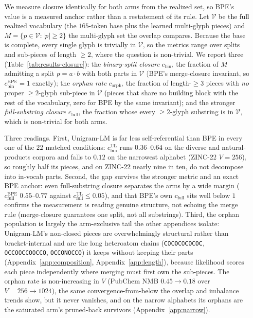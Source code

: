 \documentclass{article}
\begin{document}
We measure closure identically for both arms from the realized set, so BPE's
value is a measured anchor rather than a restatement of its rule. Let $\mathcal{V}$ be the
full realized vocabulary (the $165$-token base plus the learned multi-glyph
pieces) and $M=\{p\in\mathcal{V}:|p|\ge 2\}$ the multi-glyph set the overlap compares.
Because the base is complete, every single glyph is trivially in $\mathcal{V}$, so the
metrics range over splits and sub-pieces of length $\ge 2$, where the question
is non-trivial. We report three (Table~\ref{tab:results-closure}): the
\emph{binary-split closure} $c_{\mathrm{bin}}$, the fraction of $M$ admitting a
split $p{=}a{\cdot}b$ with both parts in $\mathcal{V}$ (BPE's merge-closure invariant, so
$c_{\mathrm{bin}}^{\mathrm{BPE}}{=}1$ exactly); the \emph{orphan rate}
$c_{\mathrm{orph}}$, the fraction of length-$\ge 3$ pieces with \emph{no} proper
$\ge 2$-glyph sub-piece in $\mathcal{V}$ (pieces that share no building block with the
rest of the vocabulary, zero for BPE by the same invariant); and the stronger
\emph{full-substring closure} $c_{\mathrm{full}}$, the fraction whose every
$\ge 2$-glyph substring is in $\mathcal{V}$, which is non-trivial for both arms.

Three readings. First, Unigram-LM is far less self-referential than BPE in every
one of the $22$ matched conditions: $c_{\mathrm{bin}}^{\mathrm{UL}}$ runs
$0.36$--$0.64$ on the diverse and natural-products corpora and falls to $0.12$ on
the narrowest alphabet (ZINC-22 $V{=}256$), so roughly half its pieces, and on
ZINC-22 nearly nine in ten, do not decompose into in-vocab parts. Second, the gap
survives the stronger metric and an exact BPE anchor: even full-substring closure
separates the arms by a wide margin ($c_{\mathrm{full}}^{\mathrm{BPE}}$
$0.55$--$0.77$ against $c_{\mathrm{full}}^{\mathrm{UL}}\le 0.05$), and that BPE's
own $c_{\mathrm{full}}$ sits well below $1$ confirms the measurement is reading
genuine structure, not echoing the merge rule (merge-closure guarantees one split,
not all substrings). Third, the orphan population is largely the arm-exclusive
tail the other appendices isolate: Unigram-LM's non-closed pieces are
overwhelmingly structural rather than bracket-internal and are the long
heteroatom chains (\texttt{COCOCOCOCOC}, \texttt{OCCOOCCOOCCO},
\texttt{OCCONOCCO}) it keeps without keeping their parts (Appendix~\ref{app:composition},
Appendix~\ref{app:length}), because likelihood scores each piece independently where
merging must first own the sub-pieces. The orphan rate is non-increasing in
$V$ (PubChem NMB $0.45\to 0.18$ over $V{=}256\to 1024$), the same
convergence-from-below the overlap and imbalance trends show, but it never
vanishes, and on the narrow alphabets its orphans are the saturated arm's
pruned-back survivors (Appendix~\ref{app:narrow}).
\end{document}
